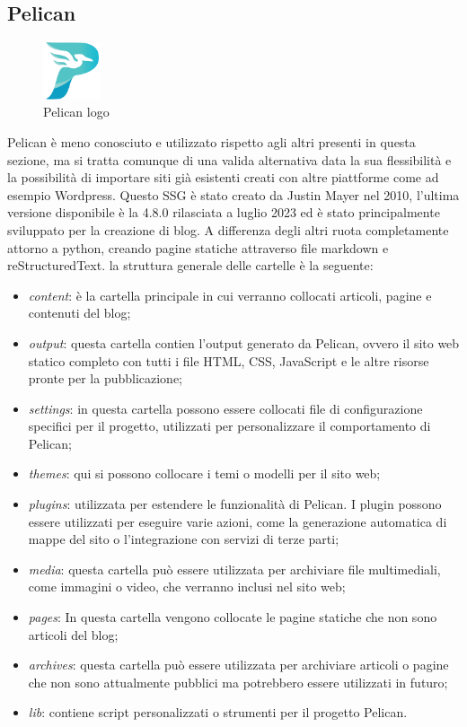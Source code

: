 \documentclass[target=bach,aauheader=]{thud}
\begin{document}
\subsection{Pelican}

\begin{figure}
    \centering
    \includegraphics[width = 0.15\textwidth]{images/pelican_logo.png}
    \caption{Pelican logo}
\end{figure}

Pelican è meno conosciuto e utilizzato rispetto agli altri presenti in questa sezione, ma si tratta comunque di una valida alternativa data la sua flessibilità e la possibilità di importare siti già esistenti creati con altre piattforme come ad esempio Wordpress.
Questo SSG è stato creato da Justin Mayer nel 2010, l'ultima versione disponibile è la 4.8.0 rilasciata a luglio 2023 ed è stato principalmente sviluppato per la creazione di blog.  
A differenza degli altri ruota completamente attorno a python, creando pagine statiche attraverso file markdown e reStructuredText. \newline
la struttura generale delle cartelle è la seguente: 
\begin{itemize}
    \item \textit{content}: è la cartella principale in cui verranno collocati articoli, pagine e contenuti del blog;
    \item \textit{output}: questa cartella contien l'output generato da Pelican, ovvero il sito web statico completo con tutti i file HTML, CSS, JavaScript e le altre risorse pronte per la pubblicazione;
    \item \textit{settings}: in questa cartella possono essere collocati file di configurazione specifici per il progetto, utilizzati per personalizzare il comportamento di Pelican;
    \item \textit{themes}: qui si possono collocare i temi o modelli per il sito web;
    \item \textit{plugins}: utilizzata per estendere le funzionalità di Pelican. I plugin possono essere utilizzati per eseguire varie azioni, come la generazione automatica di mappe del sito o l'integrazione con servizi di terze parti;
    \item \textit{media}: questa cartella può essere utilizzata per archiviare file multimediali, come immagini o video, che verranno inclusi nel sito web;
    \item \textit{pages}: In questa cartella vengono collocate le pagine statiche che non sono articoli del blog;
    \item \textit{archives}: questa cartella può essere utilizzata per archiviare articoli o pagine che non sono attualmente pubblici ma potrebbero essere utilizzati in futuro;
    \item \textit{lib}: contiene script personalizzati o strumenti per il progetto Pelican.
\end{itemize}
\end{document}
